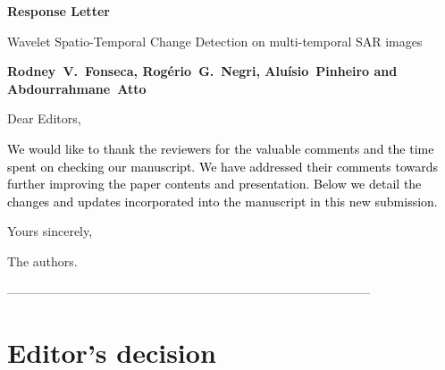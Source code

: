 \documentclass[11pt]{report}
\begin{document}
\begin{center}
\large{\textbf{Response Letter}}

\vglue 0.3cm

\huge{Wavelet Spatio-Temporal Change Detection on multi-temporal SAR images}
\end{center}

\begin{center}
\textbf{Rodney~V.~Fonseca, Rog\'{e}rio~G.~Negri, Alu\'{i}sio~Pinheiro and Abdourrahmane~Atto}
\end{center}

\date{\today}


\vspace{2cm}
\noindent Dear Editors,
\bigskip

\textcolor{black}{We would like to thank the reviewers for the valuable comments and the time spent on checking our manuscript. 
We have addressed their comments towards further improving the paper contents and presentation. 
Below we detail the changes and updates incorporated into the manuscript in this new submission.}


\medskip
\noindent Yours sincerely,

\begin{flushright}
\noindent The authors.
\end{flushright}




\noindent---------------------------------------------------------------------------------------
\section*{Editor's decision}
\end{document}
